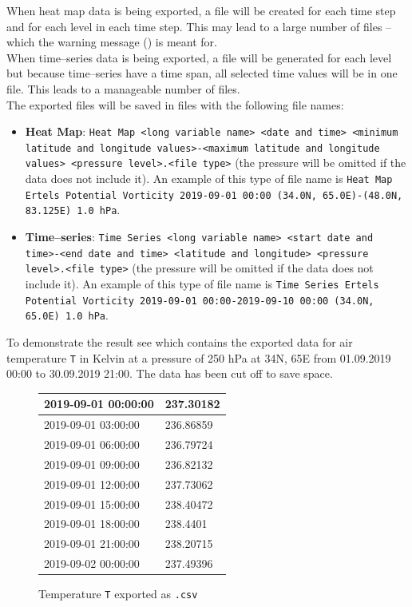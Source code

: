 \documentclass[../00_main.tex]{subfiles}
\begin{document}
When heat map data is being exported, a file will be created for each time step
and for each level in each time step. This may lead to a large number of
files -- which the warning message () is meant for.\\
When time--series data is being exported, a file will be generated for each
level but because time--series have a time span, all selected time values will
be in one file. This leads to a manageable number of files.\\
The exported files will be saved in files with the following file names:
\begin{itemize}
    \item \textbf{Heat Map}: \texttt{Heat Map <long variable name> <date and
        time> <minimum latitude and longitude values>-<maximum latitude and
        longitude values> <pressure level>.<file type>} (the pressure will be
        omitted if the data does not include it). An example of this type of
        file name is \texttt{Heat Map Ertels Potential Vorticity 2019-09-01
        00:00 (34.0N, 65.0E)-(48.0N, 83.125E) 1.0 hPa}.
    \item \textbf{Time--series}: \texttt{Time Series <long variable name>
        <start date and time>-<end date and time> <latitude and longitude> 
        <pressure level>.<file type>} (the pressure will be
        omitted if the data does not include it). An example of this type of
        file name is \texttt{Time Series Ertels Potential Vorticity 2019-09-01
        00:00-2019-09-10 00:00 (34.0N, 65.0E) 1.0 hPa}.
\end{itemize}
To demonstrate the result see  which contains the exported
data for air temperature \texttt{T} in Kelvin at a pressure of 250 hPa at 
34\textdegree{}N,
65\textdegree{}E from 01.09.2019 00:00 to 30.09.2019 21:00. The data has been cut
off to save space.
\begin{figure}
\center
    \begin{tabular}{| p{5cm} | p{5cm} |} \hline
        2019-09-01 00:00:00   &  237.30182  \\\hline 
        2019-09-01 03:00:00   &  236.86859  \\\hline
        2019-09-01 06:00:00   &  236.79724  \\\hline
        2019-09-01 09:00:00   &  236.82132  \\\hline
        2019-09-01 12:00:00   &  237.73062  \\\hline
        2019-09-01 15:00:00   &  238.40472  \\\hline
        2019-09-01 18:00:00   &  238.4401   \\\hline
        2019-09-01 21:00:00   &  238.20715  \\\hline
        2019-09-02 00:00:00   &  237.49396  \\\hline
    \end{tabular}
    \caption{Temperature \texttt{T} exported as \texttt{.csv}}
    \label{tab:de01}
\end{figure}
\end{document}
